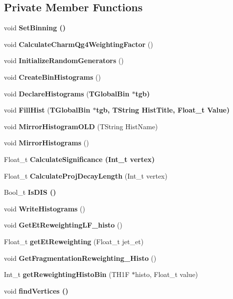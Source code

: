 \subsection*{Private Member Functions}
\begin{CompactItemize}
\item 
void \bf{Set\-Binning} ()
\item 
void \textbf{Calculate\-Charm\-Qg4Weighting\-Factor} ()\label{classTMiniNtupleAnalyzer_c92d7e494caf54acbba8a37f5f10d339}

\item 
void \textbf{Initialize\-Random\-Generators} ()\label{classTMiniNtupleAnalyzer_3126fced39cf3c5ffacc8147b9718a0f}

\item 
void \textbf{Create\-Bin\-Histograms} ()\label{classTMiniNtupleAnalyzer_b15d9a6b4809fe1656cd15aaf8c24074}

\item 
void \textbf{Declare\-Histograms} (\bf{TGlobal\-Bin} $\ast$tgb)\label{classTMiniNtupleAnalyzer_68e2ab7e18207f888db945789dab9143}

\item 
void \textbf{Fill\-Hist} (\bf{TGlobal\-Bin} $\ast$tgb, TString Hist\-Title, Float\_\-t Value)\label{classTMiniNtupleAnalyzer_d078c6a6a7fcb59db823bd1ce0e66a8d}

\item 
void \textbf{Mirror\-Histogram\-OLD} (TString Hist\-Name)\label{classTMiniNtupleAnalyzer_f9cc0e8c6569b4537dcd1e6d4b7d5769}

\item 
void \textbf{Mirror\-Histograms} ()\label{classTMiniNtupleAnalyzer_ded815e11411ec9addbf9a0513fcbf1b}

\item 
Float\_\-t \bf{Calculate\-Significance} (Int\_\-t vertex)
\item 
Float\_\-t \textbf{Calculate\-Proj\-Decay\-Length} (Int\_\-t vertex)\label{classTMiniNtupleAnalyzer_a87777b9eb8adcf55ad51df1a2f59fad}

\item 
Bool\_\-t \bf{Is\-DIS} ()
\item 
void \textbf{Write\-Histograms} ()\label{classTMiniNtupleAnalyzer_970b02310941a636c1a14dd130c789fa}

\item 
void \textbf{Get\-Et\-Reweighting\-LF\_\-histo} ()\label{classTMiniNtupleAnalyzer_2847a69f60c3518fb426f3b581bbded8}

\item 
Float\_\-t \textbf{get\-Et\-Reweighting} (Float\_\-t jet\_\-et)\label{classTMiniNtupleAnalyzer_33db0be8a39f9f9e605810559ae31c68}

\item 
void \textbf{Get\-Fragmentation\-Reweighting\_\-Histo} ()\label{classTMiniNtupleAnalyzer_f4a790d3344bdb1d38aae5d560cdacea}

\item 
Int\_\-t \textbf{get\-Reweighting\-Histo\-Bin} (TH1F $\ast$histo, Float\_\-t value)\label{classTMiniNtupleAnalyzer_6e37dcd6ef5935c1070159912c6579a1}

\item 
void \bf{find\-Vertices} ()
\end{CompactItemize}
